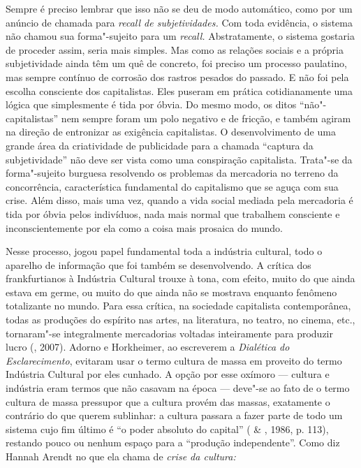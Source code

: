 {Sempre é preciso lembrar que isso não se deu de
modo automático, como por um anúncio de chamada para \emph{recall de
subjetividades.} Com toda evidência, o sistema não chamou sua
forma"-sujeito para um \emph{recall.} Abstratamente, o sistema gostaria
de proceder assim, seria mais simples. Mas como as relações sociais e a
própria subjetividade ainda têm um quê de concreto, foi preciso um processo
paulatino, mas sempre contínuo de corrosão dos rastros pesados do
passado. E não foi pela escolha consciente dos capitalistas. Eles
puseram em prática cotidianamente uma lógica que simplesmente é tida por
óbvia. Do mesmo modo, os ditos ``não"-capitalistas'' nem sempre foram um
polo negativo e de fricção, e também agiram na direção de entronizar as
exigência capitalistas. O desenvolvimento de uma grande área da
criatividade de publicidade para a chamada ``captura da subjetividade''
não deve ser vista como uma conspiração capitalista. Trata"-se da
forma"-sujeito burguesa resolvendo os problemas da mercadoria no terreno
da concorrência, característica fundamental do capitalismo que se aguça
com sua crise. Além disso, mais uma vez, quando a vida social mediada
pela mercadoria é tida por óbvia pelos indivíduos, nada mais normal que
trabalhem consciente e inconscientemente por ela como a coisa mais
prosaica do mundo.

Nesse processo, jogou papel fundamental toda a indústria cultural, todo
o aparelho de informação que foi também se desenvolvendo. A crítica dos
frankfurtianos à Indústria Cultural trouxe à tona, com efeito, muito do
que ainda estava em germe, ou muito do que ainda não se mostrava
enquanto fenômeno totalizante no mundo. Para essa crítica, na sociedade
capitalista contemporânea, todas as produções do espírito nas artes, na
literatura, no teatro, no cinema, etc., tornaram"-se integralmente
mercadorias voltadas inteiramente para produzir lucro (, 2007).
Adorno e Horkheimer, ao escreverem a \emph{Dialética do Esclarecimento},
evitaram usar o termo cultura de massa em proveito do termo Indústria
Cultural por eles cunhado. A opção por esse oxímoro --- cultura e
indústria eram termos que não casavam na época --- deve"-se ao fato de o
termo cultura de massa pressupor que a cultura provém das massas,
exatamente o contrário do que querem sublinhar: a cultura passara a
fazer parte de todo um sistema cujo fim último é ``o poder absoluto do
capital'' ( \& , 1986, p. 113), restando pouco ou nenhum
espaço para a ``produção independente''. Como diz Hannah Arendt no que
ela chama de \emph{crise da cultura:}

}
